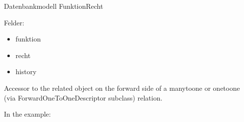 \documentclass[letterpaper,10pt,english]{sphinxmanual}
\begin{document}
\begin{fulllineitems}
\label{\detokenize{masterCodeDoc:aemter.models.FunktionRecht}}
Datenbankmodell FunktionRecht

Felder:
\begin{itemize}
\item {} 
funktion

\item {} 
recht

\item {} 
history

\end{itemize}

\begin{fulllineitems}
\label{\detokenize{masterCodeDoc:aemter.models.FunktionRecht.DoesNotExist}}
\end{fulllineitems}


\begin{fulllineitems}
\label{\detokenize{masterCodeDoc:aemter.models.FunktionRecht.MultipleObjectsReturned}}
\end{fulllineitems}


\begin{fulllineitems}
\label{\detokenize{masterCodeDoc:aemter.models.FunktionRecht.funktion}}
Accessor to the related object on the forward side of a many\sphinxhyphen{}to\sphinxhyphen{}one or
one\sphinxhyphen{}to\sphinxhyphen{}one (via ForwardOneToOneDescriptor subclass) relation.

In the example:

\begin{sphinxVerbatim}[commandchars=\\\{\}]
 
       
\end{sphinxVerbatim}


\end{fulllineitems}
\end{fulllineitems}
\end{document}
